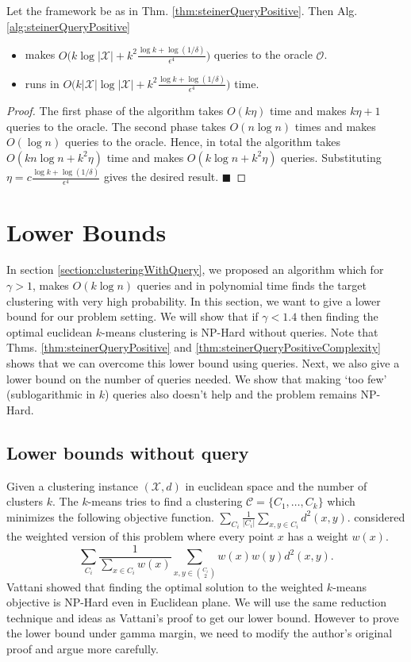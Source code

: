 \documentclass[orivec]{llncs}
\newcommand{\mc}{\mathcal}
\renewcommand{\qed}{\hfill\ensuremath{\blacksquare}}
\begin{document}
\begin{theorem}
\label{thm:steinerQueryPositiveComplexity}
Let the framework be as in Thm. \ref{thm:steinerQueryPositive}. Then Alg. \ref{alg:steinerQueryPositive} 
\begin{itemize}[nolistsep,noitemsep]
\item makes $O\big(k\log |\mc X| + k^2\frac{\log k + \log (1/\delta)}{\epsilon^4}\big)$ queries to the oracle $\mc O$.
\item runs in $O\big(k|\mc X|\log |\mc X| + k^2\frac{\log k + \log (1/\delta)}{\epsilon^4}\big)$ time.
\end{itemize}
\end{theorem}

\begin{proof}
The first phase of the algorithm takes $O(k\eta)$ time and makes $k\eta+1$ queries to the oracle. The second phase takes $O(n\log n)$ times and makes $O(\log n)$ queries to the oracle. Hence, in total the algorithm takes $O(kn\log n + k^2\eta)$ time and makes $O(k\log n + k^2\eta)$ queries. Substituting $\eta = c\frac{\log k + \log(1/\delta)}{\epsilon^4}$ gives the desired result.
\qed
\end{proof}

\section{Lower Bounds}
\label{section:lowerBounds}
In section \ref{section:clusteringWithQuery}, we proposed an algorithm which for $\gamma > 1$, makes $O(k\log n)$ queries and in polynomial time finds the target clustering with very high probability. In this section, we want to give a lower bound for our problem setting. We will show that if $\gamma < 1.4$ then finding the optimal euclidean $k$-means clustering is NP-Hard without queries. Note that Thms. \ref{thm:steinerQueryPositive} and \ref{thm:steinerQueryPositiveComplexity} shows that we can overcome this lower bound using queries. Next, we also give a lower bound on the number of queries needed. We show that making `too few' (sublogarithmic in $k$) queries also doesn't help and the problem remains NP-Hard.

\subsection{Lower bounds without query}
Given a clustering instance $(\mc X, d)$ in euclidean space and the number of clusters $k$. The $k$-means tries to find a clustering $\mc C = \{C_1, \ldots, C_k\}$ which minimizes the following objective function. $\sum\limits_{C_i}\frac{1}{|C_i|} \sum_{x, y \in C_i} d^2(x, y)$. \cite{vattani2009hardness} considered the weighted version of this problem where every point $x$ has a weight $w(x)$. $$\sum\limits_{C_i}\frac{1}{\sum_{x \in C_i}w(x)} \sum_{x, y \in {C_i \choose 2}} w(x)w(y)d^2(x, y).$$ Vattani showed that finding the optimal solution to the weighted $k$-means objective is NP-Hard even in Euclidean plane. We will use the same reduction technique and ideas as Vattani's proof to get our lower bound. However to prove the lower bound under gamma margin, we need to modify the author's original proof and argue more carefully.
\end{document}
